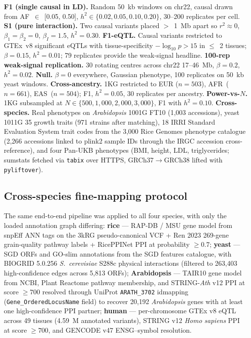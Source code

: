 \textbf{F1 (single causal in LD).} Random 50~kb windows on chr22,
causal drawn from AF~$\in$~[0.05, 0.50], $h^2 \in \{0.02, 0.05, 0.10, 0.20\}$,
30--200 replicates per cell.
\textbf{S1 (pure interaction).} Two causal variants placed
$>$~1~Mb apart so $r^2 \approx 0$, $\beta_1 = \beta_2 = 0$,
$\beta_I = 1.5$, $h^2 = 0.30$.
\textbf{F1-eQTL.} Causal variants restricted to GTEx~v8 significant
eQTLs with tissue-specificity $-\log_{10} p > 15$ in $\leq$~2
tissues; $\beta{=}0.15$, $h^2{=}0.01$; 79 replicates provide the
weak-signal headline.
\textbf{100-rep weak-signal replication.} 30 rotating centres across
chr22 17--46~Mb, $\beta{=}0.2$, $h^2{=}0.02$.
\textbf{Null.} $\beta{=}0$ everywhere, Gaussian phenotype, 100
replicates on 50~kb yeast windows.
\textbf{Cross-ancestry.} 1KG restricted to EUR ($n{=}503$),
AFR~($n{=}661$), EAS~($n{=}504$); F1, $h^2{=}0.05$, 30 replicates
per ancestry.
\textbf{Power-vs-$N$.} 1KG subsampled at
$N \in \{500, 1{,}000, 2{,}000, 3{,}000\}$, F1 with $h^2{=}0.10$.
\textbf{Cross-species.} Real phenotypes on \emph{Arabidopsis}
1001G FT10 (1{,}003 accessions), yeast 1011G 35 growth traits
(971 strains after matching), 18 IRRI Standard Evaluation System
trait codes from the 3{,}000 Rice Genomes\cite{wang2018genomic}
phenotype catalogue (2{,}266 accessions linked to plink2 sample
IDs through the IRGC accession cross-reference), and four Pan-UKB
phenotypes (BMI, height, LDL, triglycerides; sumstats fetched via
\texttt{tabix} over HTTPS, GRCh37$\to$GRCh38 lifted with
\texttt{pyliftover}).

\subsection*{Cross-species fine-mapping protocol}\label{methods:multispecies}

The same end-to-end pipeline was applied to all four species, with
only the loaded annotation graph differing:
\textbf{rice} --- RAP-DB / MSU gene
model\cite{sakai2013rapdb} from
snpEff\cite{cingolani2012snpeff} ANN tags on the 3kRG
pseudo-canonical VCF + Ren 2023\cite{ren2023rice} 269-gene
grain-quality pathway labels + RicePPINet\cite{liu2017riceppinet}
PPI at probability $\geq 0.7$;
\textbf{yeast} --- SGD\cite{engel2014sgd} ORFs and
GO\cite{ashburner2000go}-slim annotations from the SGD features
catalogue, with BIOGRID\cite{oughtred2021biogrid} 5.0.256
\emph{S.~cerevisiae} S288c physical interactions (filtered to
263{,}403 high-confidence edges across 5{,}813 ORFs);
\textbf{Arabidopsis} --- TAIR10\cite{berardini2015tair} gene model
from NCBI, Plant Reactome\cite{gillespie2022reactome} pathway
membership, and STRING-\emph{Ath} v12\cite{szklarczyk2023string}
PPI at score $\geq 700$ resolved through
UniProt\cite{uniprot2023} \texttt{ARATH\_3702} idmapping
(\texttt{Gene\_OrderedLocusName} field) to recover
20{,}192 \emph{Arabidopsis} genes with at least
one high-confidence PPI partner;
\textbf{human} --- per-chromosome GTEx v8\cite{gtex2020} eQTL
across 49 tissues (4.59~M annotated variants), STRING
v12\cite{szklarczyk2023string} \emph{Homo sapiens} PPI at score
$\geq 700$, and GENCODE v47\cite{frankish2023gencode} ENSG--symbol
resolution.

